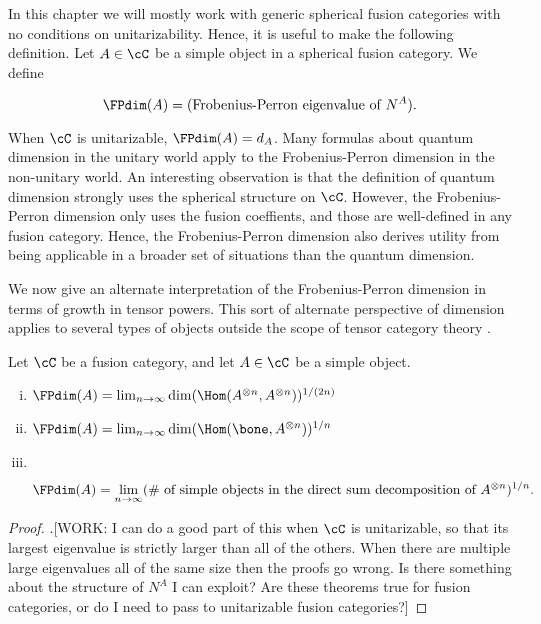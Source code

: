 In this chapter we will mostly work with generic spherical fusion categories with no conditions on unitarizability. Hence, it is useful to make the following definition. Let $A\in\cC$ be a simple object in a spherical fusion category. We define

$$\FPdim(A)=(\text{Frobenius-Perron eigenvalue of $N^A$}).$$

When $\cC$ is unitarizable, $\FPdim(A)=d_A$. Many formulas about quantum dimension in the unitary world apply to the Frobenius-Perron dimension in the non-unitary world. An interesting observation is that the definition of quantum dimension strongly uses the spherical structure on $\cC$. However, the Frobenius-Perron dimension only uses the fusion coeffients, and those are well-defined in any fusion category. Hence, the Frobenius-Perron dimension also derives utility from being applicable in a broader set of situations than the quantum dimension.

We now give an alternate interpretation of the Frobenius-Perron dimension in terms of growth in tensor powers. This sort of alternate perspective of dimension applies to several types of objects outside the scope of tensor category theory \cite{coulembier2024growth}.

\begin{prop} Let $\cC$ be a fusion category, and let $A\in \cC$ be a simple object.

\begin{enumerate}[(i)]
\item $\FPdim(A)=\lim_{n\to\infty}\dim(\Hom(A^{\otimes n},A^{\otimes n}))^{1/(2n)}$
\item $\FPdim(A)=\lim_{n\to\infty}\dim(\Hom(\bone,A^{\otimes n}))^{1/n}$
\item $\,$

$$\FPdim(A)=\lim_{n\to\infty}(\text{\# of simple objects in the direct sum decomposition of $A^{\otimes n}$})^{1/n}.$$
\end{enumerate}
\end{prop}
\begin{proof}.[WORK: I can do a good part of this when $\cC$ is unitarizable, so that its largest eigenvalue is strictly larger than all of the others. When there are multiple large eigenvalues all of the same size then the proofs go wrong. Is there something about the structure of $N^A$ I can exploit? Are these theorems true for fusion categories, or do I need to pass to unitarizable fusion categories?]
\end{proof}

